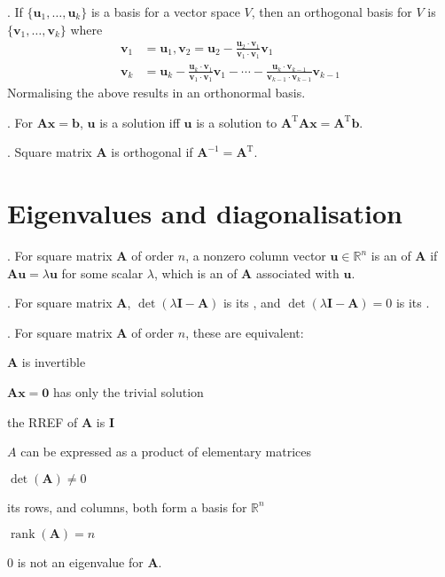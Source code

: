 \documentclass{slnotes}
\DeclareMathOperator*{\rank}{rank}
\newcommand*{\TT}{\mathrm{T}}
\begin{document}
. If \(\{\mathbf{u}_1, \hdots, \mathbf{u}_k\}\) is a basis for a vector space \(V\), then an orthogonal basis for \(V\) is \(\{\mathbf{v}_1, \hdots, \mathbf{v}_k\}\) where \begin{align*}
\mathbf{v}_1 &= \mathbf{u}_1, \mathbf{v}_2 = \mathbf{u}_2 - \frac{\mathbf{u}_2 \cdot \mathbf{v}_1}{\mathbf{v}_1 \cdot \mathbf{v}_1}\mathbf{v}_1\\
\mathbf{v}_k &= \mathbf{u}_k - \frac{\mathbf{u}_k \cdot \mathbf{v}_1}{\mathbf{v}_1 \cdot \mathbf{v}_1}\mathbf{v}_1 - \cdots - \frac{\mathbf{u}_k \cdot \mathbf{v}_{k-1}}{\mathbf{v}_{k-1} \cdot \mathbf{v}_{k-1}}\mathbf{v}_{k-1}
\end{align*}
Normalising the above results in an orthonormal basis.

. For \(\mathbf{Ax} = \mathbf{b}\), \(\mathbf{u}\) is a  solution iff \(\mathbf{u}\) is a solution to \(\mathbf{A}^\TT\mathbf{Ax} = \mathbf{A}^\TT\mathbf{b}\).

. Square matrix \(\mathbf A\) is orthogonal if \(\mathbf{A}^{-1} = \mathbf{A}^\TT\).

\chapter{Eigenvalues and diagonalisation}
. For square matrix \(\mathbf A\) of order \(n\), a nonzero column vector \(\mathbf u \in \mathbb{R}^n\) is an  of \(\mathbf A\) if \(\mathbf{Au} = \lambda\mathbf{u}\) for some scalar \(\lambda\), which is an  of \(\mathbf A\) associated with \(\mathbf u\).

. For square matrix \(\mathbf A\), \(\det(\lambda\mathbf I - \mathbf A)\) is its , and \(\det(\lambda\mathbf I - \mathbf A) = 0\) is its .

. For square matrix \(\mathbf A\) of order \(n\), these are equivalent:
\begin{slinenum}
\item \(\mathbf A\) is invertible
\item \(\mathbf{Ax} = \mathbf{0}\) has only the trivial solution
\item the RREF of \(\mathbf A\) is \(\mathbf I\)
\item \(A\) can be expressed as a product of elementary matrices
\item \(\det(\mathbf A) \ne 0\)
\item its rows, and columns, both form a basis for \(\mathbb{R}^n\)
\item \(\rank(\mathbf A) = n\)
\item \(0\) is not an eigenvalue for \(\mathbf A\).
\end{slinenum}
\end{document}
